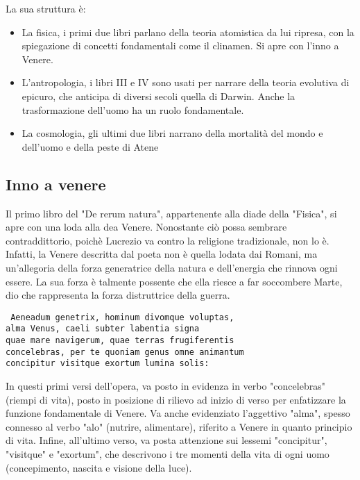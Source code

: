 \documentclass[10pt,a4paper]{article}
\begin{document}
	La sua struttura è:
	
	\begin{itemize}
		\item La fisica, i primi due libri parlano della teoria atomistica da lui ripresa, con la spiegazione di concetti fondamentali come il clinamen. Si apre con l'inno a Venere.
		\item L'antropologia, i libri III e IV sono usati per narrare della teoria evolutiva di epicuro, che anticipa di diversi secoli quella di Darwin. Anche la trasformazione dell'uomo ha un ruolo fondamentale. 
		\item La cosmologia, gli ultimi due libri narrano della mortalità del mondo e dell'uomo e della peste di Atene
	\end{itemize}

	\subsection{Inno a venere}
	
	Il primo libro del "De rerum natura", appartenente alla diade della "Fisica", si apre con una loda alla dea Venere. Nonostante ciò possa sembrare contraddittorio, poichè Lucrezio va contro la religione tradizionale, non lo è. Infatti, la Venere descritta dal poeta non è quella lodata dai Romani, ma un'allegoria della forza generatrice della natura e dell'energia che rinnova ogni essere. La sua forza è talmente possente che ella riesce a far soccombere Marte, dio che rappresenta la forza distruttrice della guerra. 
	
		\begin{estratto}
\texttt{	Aeneadum genetrix, hominum divomque voluptas, \\
			alma Venus, caeli subter labentia signa \\
			quae mare navigerum, quae terras frugiferentis \\
			concelebras, per te quoniam genus omne animantum \\
			concipitur visitque exortum lumina solis: }
		\end{estratto}
	
	In questi primi versi dell'opera, va posto in evidenza in verbo "concelebras" (riempi di vita), posto in posizione di rilievo ad inizio di verso per enfatizzare la funzione fondamentale di Venere. Va anche evidenziato l'aggettivo "alma", spesso connesso al verbo "alo" (nutrire, alimentare), riferito a Venere in quanto principio di vita. Infine, all'ultimo verso, va posta attenzione sui lessemi "concipitur", "visitque" e "exortum", che descrivono i tre momenti della vita di ogni uomo (concepimento, nascita e visione della luce).
	
\end{document}
